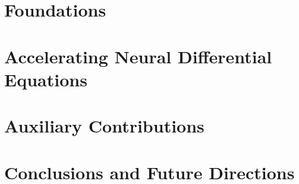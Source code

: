 \documentclass{../common/thesis}
\begin{document}
\begin{frontmatter}
  \SgAddTitle%
  \SgAddToc%
  \SgAddLof%
  \SgAddLot%
  \SgAddLoa%
\end{frontmatter}



\part{Foundations}
\label{part:foundations}





\part{Accelerating Neural Differential Equations}
\label{part:accelerating_nde}




\part{Auxiliary Contributions}  %
\label{part:auxiliary_contributions}



\part{Conclusions and Future Directions}
\label{part:conclusion_and_future_work}




\end{document}
